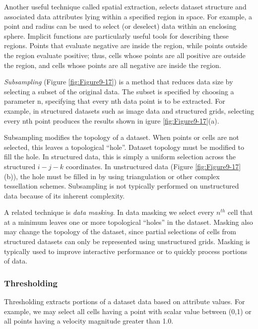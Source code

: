 Another useful technique called spatial extraction, selects dataset structure and associated data attributes lying within a specified region in space. For example, a point and radius can be used to select (or deselect) data within an enclosing sphere. Implicit functions are particularly useful tools for describing these regions. Points that evaluate negative are inside the region, while points outside the region evaluate positive; thus, cells whose points are all positive are outside the region, and cells whose points are all negative are inside the region.

\emph{Subsampling} (Figure \ref{fig:Figure9-17}) is a method that reduces data size by selecting a subset of the original data. The subset is specified by choosing a parameter n, specifying that every nth data point is to be extracted. For example, in structured datasets such as image data and structured grids, selecting every nth point produces the results shown in igure \ref{fig:Figure9-17}(a).

Subsampling modifies the topology of a dataset. When points or cells are not selected, this leaves a topological ``hole''. Dataset topology must be modified to fill the hole. In structured data, this is simply a uniform selection across the structured $i-j-k$ coordinates. In unstructured data (Figure \ref{fig:Figure9-17}(b)), the hole must be filled in by using triangulation or other complex tessellation schemes. Subsampling is not typically performed on unstructured data because of its inherent complexity.

A related technique is \emph{data masking}. In data masking we select every $n^{th}$ cell that at a minimum leaves one or more topological ``holes'' in the dataset. Masking also may change the topology of the dataset, since partial selections of cells from structured datasets can only be represented using unstructured grids. Masking is typically used to improve interactive performance or to quickly process portions of data.

\subsubsection{Thresholding}
\label{subsubsec:thresholding}

Thresholding extracts portions of a dataset data based on attribute values. For example, we may select all cells having a point with scalar value between (0,1) or all points having a velocity magnitude greater than 1.0.


